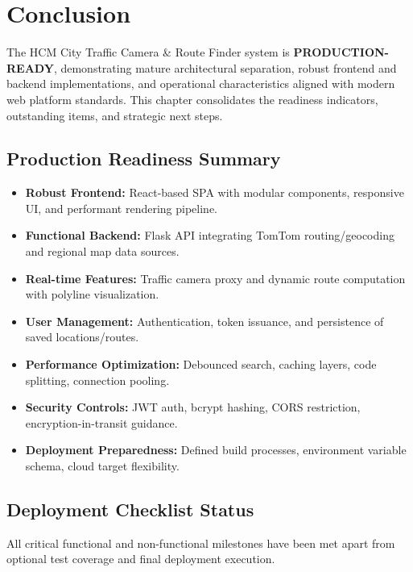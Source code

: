 \chapter{Conclusion}\label{chap:conclusion}

The HCM City Traffic Camera \& Route Finder system is \textbf{PRODUCTION-READY}, demonstrating mature architectural separation, robust frontend and backend implementations, and operational characteristics aligned with modern web platform standards. This chapter consolidates the readiness indicators, outstanding items, and strategic next steps.

\section{Production Readiness Summary}
\begin{itemize}
    \item \textbf{Robust Frontend:} React-based SPA with modular components, responsive UI, and performant rendering pipeline.
    \item \textbf{Functional Backend:} Flask API integrating TomTom routing/geocoding and regional map data sources.
    \item \textbf{Real-time Features:} Traffic camera proxy and dynamic route computation with polyline visualization.
    \item \textbf{User Management:} Authentication, token issuance, and persistence of saved locations/routes.
    \item \textbf{Performance Optimization:} Debounced search, caching layers, code splitting, connection pooling.
    \item \textbf{Security Controls:} JWT auth, bcrypt hashing, CORS restriction, encryption-in-transit guidance.
    \item \textbf{Deployment Preparedness:} Defined build processes, environment variable schema, cloud target flexibility.
\end{itemize}

\section{Deployment Checklist Status}
All critical functional and non-functional milestones have been met apart from optional test coverage and final deployment execution.

